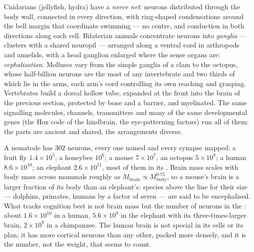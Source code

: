 \begin{definition}\label{def:b3:nervous-systems:comparative}
Cnidarians (jellyfish, hydra) have a \emph{nerve net}: neurons
distributed through the body wall, connected in every direction, with
ring-shaped condensations around the bell margin that coordinate
swimming --- no centre, and conduction in both directions along each
cell. Bilaterian animals concentrate neurons into \emph{ganglia} ---
clusters with a shared neuropil --- arranged along a ventral cord in
arthropods and annelids, with a head ganglion enlarged where the sense
organs are: \emph{cephalisation}. Molluscs vary from the simple ganglia
of a clam to the octopus, whose half-billion neurons are the most of
any invertebrate and two thirds of which lie in the arms, each arm's
cord controlling its own reaching and grasping. Vertebrates build a
dorsal hollow tube, expanded at the front into the brain of the
previous section, protected by bone and a barrier, and myelinated. The
same signalling molecules, channels, transmitters and many of the same
developmental genes (the Hox code of the hindbrain, the eye-patterning
factors) run all of them: the parts are ancient and shared, the
arrangements diverse.
\end{definition}

\begin{example}\label{ex:b3:nervous-systems:counts}
A nematode has $302$ neurons, every one named and every synapse
mapped; a fruit fly $1.4\times 10^{5}$; a honeybee $10^{6}$; a mouse
$7\times 10^{7}$; an octopus $5\times 10^{8}$; a human $8.6\times
10^{10}$; an elephant $2.6\times 10^{11}$, most of them in its
. Brain mass scales with body mass across mammals roughly as
$M_{\text{brain}} \propto M_{\text{body}}^{0.75}$, so a mouse's brain
is a larger fraction of its body than an elephant's; species above the
line for their size --- dolphins, primates, humans by a factor of
seven --- are said to be encephalised. What tracks cognition best is
not brain mass but the number of neurons in the : about
$1.6\times 10^{10}$ in a human, $5.6\times 10^{9}$ in the elephant with
its three-times-larger brain, $2\times 10^{9}$ in a chimpanzee. The
human brain is not special in its cells or its plan; it has more
cortical neurons than any other, packed more densely, and it is the
number, not the weight, that seems to count.
\end{example}

